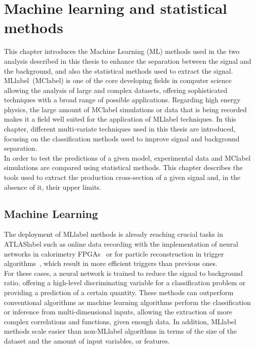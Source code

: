 \chapter{Machine learning and statistical methods}
\label{chapter:MLStat}

This chapter introduces the Machine Learning (ML) methods used in the two analysis described in this thesis to enhance the separation between the signal and the background, and also the statistical methods used to extract the signal.\\

\acrlong{MLlabel}~(\acrshort{MClabel}) is one of the core developing fields in computer science allowing the analysis of large and complex datasets, offering sophisticated techniques with a broad range of possible applications. Regarding high energy physics, the large amount of \acrshort{MClabel} simulations or data that is being recorded makes it a field well suited for the application of \acrshort{MLlabel} techniques. In this chapter, different multi-variate techniques used in this thesis are introduced, focusing on the classification methods used to improve signal and background separation.\\

In order to test the predictions of a given model, experimental data and \acrshort{MClabel} simulations are compared using statistical methods. This chapter describes the tools used to extract the production cross-section of a given signal and, in the absence of it, their upper limits.

\section{Machine Learning}

The deployment of \acrshort{MLlabel} methods is already reaching crucial tasks in \acrshort{ATLASlabel} such as online data recording with the implementation of neural networks in calorimetry FPGAs~\cite{Laatu:2022fni} or for particle reconstruction in trigger algorithms~\cite{ATLAS:2019uhp}, which result in more efficient triggers than previous ones.\\

For these cases, a neural network is trained to reduce the signal to background ratio, offering a high-level discriminating variable for a classification problem or providing a prediction of a certain quantity. These methods can outperform conventional algorithms as machine learning algorithms perform the classification or inference from multi-dimensional inputs, allowing the extraction of more complex correlations and functions, given enough data. In addition, \acrshort{MLlabel} methods scale easier than non-\acrshort{MLlabel} algorithms in terms of the size of the dataset and the amount of input variables, or features.\\

